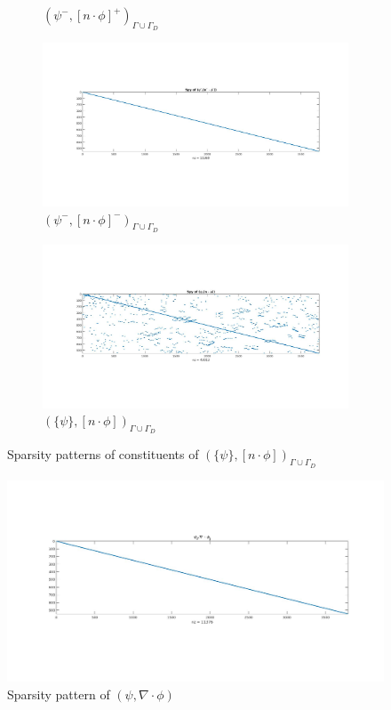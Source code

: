 \documentclass[a4paper,12pt]{book}
\begin{document}
\begin{figure}[H]
\begin{subfigure}{.5\textwidth}
  \caption{$( \psi^- ,[n \cdot \phi]^+)_{\Gamma \cup \Gamma_D}$}
  \label{fig:figure43}
\end{subfigure}
\begin{subfigure}{.5\textwidth}	
\centering
  \includegraphics[width=\linewidth]{figure44.jpg}
  \caption{$( \psi^- ,[n \cdot \phi]^-)_{\Gamma \cup \Gamma_D}$}
  \label{fig:figure44}
\end{subfigure}
\begin{subfigure}{\textwidth}	
\centering
  \includegraphics[width=\linewidth]{figure4.jpg}
  \caption{$(\lbrace \psi \rbrace ,[n \cdot \phi])_{\Gamma \cup \Gamma_D}$}
  \label{fig:figure4}
\end{subfigure}
\caption{Sparsity patterns of constituents of $(\lbrace \psi  \rbrace,[n \cdot \phi])_{\Gamma \cup \Gamma_D}$}
\label{figure_4_all}
\end{figure}

\begin{figure}[H]
\centering
  \includegraphics[width=\linewidth]{figure5.jpg}
  \caption{Sparsity pattern of $(\psi,\nabla \cdot \phi)$}
  \label{figure_5}
\end{figure}
\end{document}
